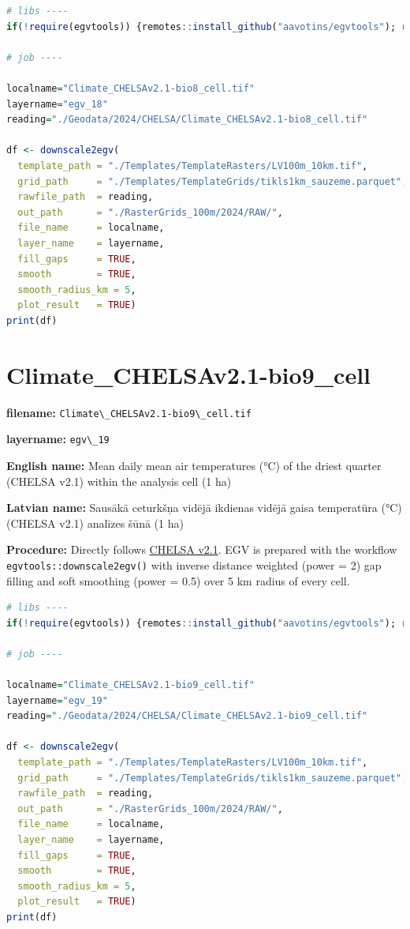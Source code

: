 \documentclass[
]{book}
\newcommand{\passthrough}[1]{#1}
\begin{document}
\begin{lstlisting}[language=R]
# libs ----
if(!require(egvtools)) {remotes::install_github("aavotins/egvtools"); require(egvtools)}

# job ----

localname="Climate_CHELSAv2.1-bio8_cell.tif"
layername="egv_18"
reading="./Geodata/2024/CHELSA/Climate_CHELSAv2.1-bio8_cell.tif"

df <- downscale2egv(
  template_path = "./Templates/TemplateRasters/LV100m_10km.tif",
  grid_path     = "./Templates/TemplateGrids/tikls1km_sauzeme.parquet",
  rawfile_path  = reading,
  out_path      = "./RasterGrids_100m/2024/RAW/",
  file_name     = localname,
  layer_name    = layername,
  fill_gaps     = TRUE,
  smooth        = TRUE,
  smooth_radius_km = 5,
  plot_result   = TRUE)
print(df)
\end{lstlisting}

\section{Climate\_CHELSAv2.1-bio9\_cell}\label{ch06.019}

\textbf{filename:} \passthrough{\lstinline!Climate\_CHELSAv2.1-bio9\_cell.tif!}

\textbf{layername:} \passthrough{\lstinline!egv\_19!}

\textbf{English name:} Mean daily mean air temperatures (°C) of the driest quarter (CHELSA v2.1) within the analysis cell (1 ha)

\textbf{Latvian name:} Sausākā ceturkšņa vidējā ikdienas vidējā gaisa temperatūra (°C) (CHELSA v2.1) analīzes šūnā (1 ha)

\textbf{Procedure:} Directly follows \hyperref[Ch04.11]{CHELSA v2.1}. EGV is prepared with the
workflow \passthrough{\lstinline!egvtools::downscale2egv()!} with inverse distance weighted (power = 2)
gap filling and soft smoothing (power = 0.5) over 5 km radius of every cell.

\begin{lstlisting}[language=R]
# libs ----
if(!require(egvtools)) {remotes::install_github("aavotins/egvtools"); require(egvtools)}

# job ----

localname="Climate_CHELSAv2.1-bio9_cell.tif"
layername="egv_19"
reading="./Geodata/2024/CHELSA/Climate_CHELSAv2.1-bio9_cell.tif"

df <- downscale2egv(
  template_path = "./Templates/TemplateRasters/LV100m_10km.tif",
  grid_path     = "./Templates/TemplateGrids/tikls1km_sauzeme.parquet",
  rawfile_path  = reading,
  out_path      = "./RasterGrids_100m/2024/RAW/",
  file_name     = localname,
  layer_name    = layername,
  fill_gaps     = TRUE,
  smooth        = TRUE,
  smooth_radius_km = 5,
  plot_result   = TRUE)
print(df)
\end{lstlisting}
\end{document}
